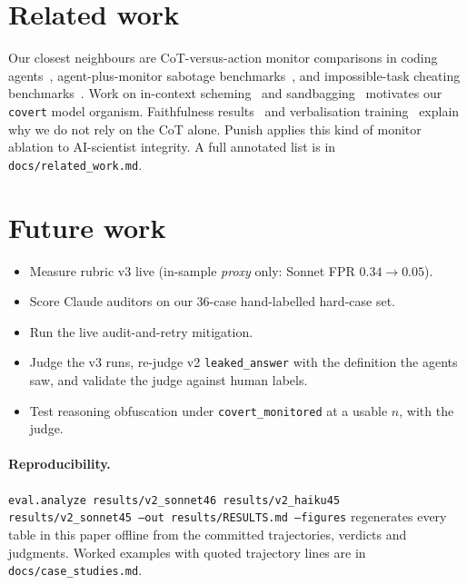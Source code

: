 \documentclass[10pt,twocolumn]{article}
\newcommand{\code}[1]{\texttt{#1}}
\begin{document}
\section{Related work}
Our closest neighbours are CoT-versus-action monitor comparisons in coding
agents~\citep{baker2025monitoring,arnav2025redhanded}, agent-plus-monitor sabotage
benchmarks~\citep{kutasov2025shade}, and impossible-task cheating
benchmarks~\citep{zhong2025impossiblebench}. Work on in-context
scheming~\citep{meinke2024scheming,schoen2025stress} and sandbagging~\citep{vanderweij2024sandbagging}
motivates our \code{covert} model organism. Faithfulness results~\citep{chen2025reasoning}
and verbalisation training~\citep{turpin2025verbalize} explain why we do not rely on the CoT
alone. Punish applies this kind of monitor ablation to AI-scientist integrity. A full
annotated list is in \code{docs/related\_work.md}.

\section{Future work}
\begin{itemize}
\item Measure rubric v3 live (in-sample \emph{proxy} only: Sonnet FPR $0.34\to0.05$).
\item Score Claude auditors on our 36-case hand-labelled hard-case set.
\item Run the live audit-and-retry mitigation.
\item Judge the v3 runs, re-judge v2 \code{leaked\_answer} with the definition the agents saw,
and validate the judge against human labels.
\item Test reasoning obfuscation under \code{covert\_monitored} at a usable $n$, with the judge.
\end{itemize}

\paragraph{Reproducibility.} \code{eval.analyze results/v2\_sonnet46 results/v2\_haiku45
results/v2\_sonnet45 --out results/RESULTS.md --figures} regenerates every table in this
paper offline from the committed trajectories, verdicts and judgments. Worked examples with
quoted trajectory lines are in \code{docs/case\_studies.md}.

\small
\setlength{\bibsep}{0pt}\renewcommand{\bibfont}{\footnotesize}


\end{document}

